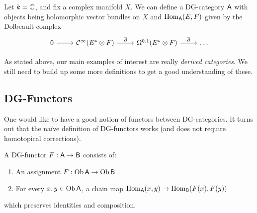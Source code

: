 \documentclass{amsart}
\begin{document}
\begin{ex}
Let $k = \mathbb{C}$, and fix a complex manifold $X$.
We can define a DG-category $\mathsf{A}$ with objects being holomorphic vector bundles on $X$ and $\operatorname{Hom}_{\mathsf{A}}(E, F)$ given by the Dolbeault complex
\[
\begin{tikzcd}
0 \rar & \Cc^\infty(E^* \otimes F) \rar["\ol{\partial}"] & \Omega^{0,1}(E^* \otimes F) \rar["\ol{\partial}"] & \dots
\end{tikzcd}
\]
\end{ex}

As stated above, our main examples of interest are really \emph{derived categories}.
We still need to build up some more definitions to get a good understanding of these.

\subsection{DG-Functors}

One would like to have a good notion of functors between DG-categories.
It turns out that the na\"ive definition of DG-functors works (and does not require homotopical corrections).

\begin{dfn}
A DG-functor $F: \mathsf{A} \to \mathsf{B}$ consists of:
\begin{enumerate}
\item An assignment $F: \operatorname{Ob} \mathsf{A} \to \operatorname{Ob} \mathsf{B}$
\item For every $x, y \in \operatorname{Ob} \mathsf{A}$, a chain map $\operatorname{Hom}_{\mathsf{A}}(x, y) \to \operatorname{Hom}_{\mathsf{B}}(F(x), F(y))$
\end{enumerate}
which preserves identities and composition.
\end{dfn}
\end{document}
